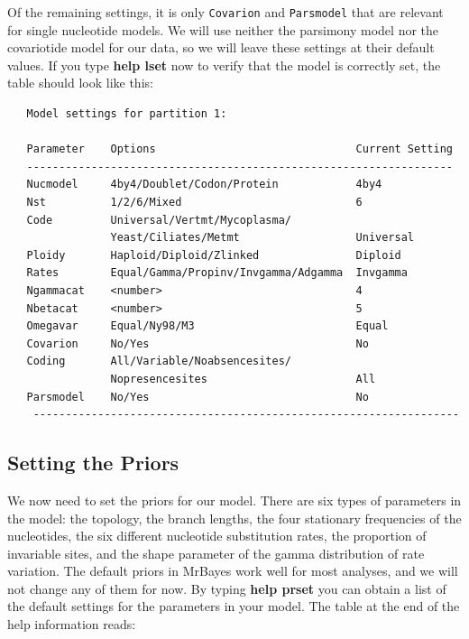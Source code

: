 \documentclass[12pt]{book}
\begin{document}
Of the remaining settings, it is only \texttt{Covarion} and \texttt{Parsmodel} that are relevant for single
 nucleotide models. We will use neither the parsimony model nor the covariotide model for our data, so we
 will leave these settings at their default values. If you type \textbf{help lset} now to verify that the
 model is correctly set, the table should look like this:

\begin{singlespacing}
\small
\begin{verbatim}
   Model settings for partition 1:
 
   Parameter    Options                               Current Setting
   ------------------------------------------------------------------
   Nucmodel     4by4/Doublet/Codon/Protein            4by4                         
   Nst          1/2/6/Mixed                           6                         
   Code         Universal/Vertmt/Mycoplasma/                                     
                Yeast/Ciliates/Metmt                  Universal                         
   Ploidy       Haploid/Diploid/Zlinked               Diploid                         
   Rates        Equal/Gamma/Propinv/Invgamma/Adgamma  Invgamma                         
   Ngammacat    <number>                              4                         
   Nbetacat     <number>                              5                         
   Omegavar     Equal/Ny98/M3                         Equal                         
   Covarion     No/Yes                                No                         
   Coding       All/Variable/Noabsencesites/                                     
                Nopresencesites                       All                         
   Parsmodel    No/Yes                                No                         
    ------------------------------------------------------------------
\end{verbatim}
\normalsize
\end{singlespacing}

\subsection{Setting the Priors}

We now need to set the priors for our model. There are six types of parameters in the model: the topology,
 the branch lengths, the four stationary frequencies of the nucleotides, the six different nucleotide
 substitution rates, the proportion of invariable sites, and the shape parameter of the gamma distribution
 of rate variation. The default priors in MrBayes work well for most analyses, and we will not change any
 of them for now. By typing \textbf{help prset} you can obtain a list of the default settings for the
 parameters in your model. The table at the end of the help information reads:
\end{document}

